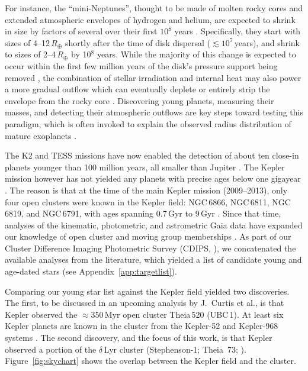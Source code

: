 \documentclass[12pt,modern,twocolumn,tighten]{aastex63}
\begin{document}
For instance, the ``mini-Neptunes'', thought to be made of molten
rocky cores \citep{kite_atmosphere_2020} and extended atmospheric
envelopes of hydrogen and helium, are expected to shrink in size by
factors of several over their first $10^8$ years
\citep{owen_atmospheres_2016,owen_constraining_2020}.  Specifically,
they start with sizes of 4--12\,$R_\oplus$ shortly after the time of disk
dispersal ($\lesssim$$10^7$\,years), and shrink to sizes of
2--4\,$R_\oplus$ by 10$^8$ years.  While the majority of this change
is expected to occur within the first few million years of the disk's pressure
support being removed \citep{owen_atmospheres_2016}, the combination of stellar
irradiation and internal heat may also power a more
gradual outflow which can eventually deplete or entirely strip the
envelope from the rocky core
\citep{Owen_Wu_2013,ginzburg_corepowered_2018}.  Discovering young
planets, measuring their masses, and detecting their atmospheric
outflows are key steps toward testing this paradigm, which is often
invoked to explain the observed radius distribution of mature
exoplanets \citep{Fulton_et_al_2017}.

The K2 and TESS missions have now enabled the detection of about ten
close-in planets younger than 100 million years, all smaller than
Jupiter
\citep{Mann_K2_33b_2016,David_et_al_2017,david_four_2019,newton_tess_2019,bouma_cluster_2020,plavchan_planet_2020,rizzuto_tess_2020}.
The Kepler mission however has not yielded any planets with precise
ages below one gigayear \citep{Meibom_et_al_2013}.  The reason is that
at the time of the main Kepler mission (2009--2013), only four open
clusters were known in the Kepler field: NGC\,6866, NGC\,6811,
NGC\,6819, and NGC\,6791, with ages spanning 0.7\,Gyr to 9\,Gyr
\citep{meibom_kepler_2011}.  Since that time, analyses of the
kinematic, photometric, and astrometric Gaia data have expanded our
knowledge of open cluster and moving group memberships \citep[{\it
e.g.},][]{cantatgaudin_gaia_2018,zari_3d_2018,kounkel_untangling_2019,Meingast2021,kerr_stars_2021}.
As part of our Cluster Difference Imaging Photometric Survey (CDIPS,
\citealt{bouma_cdipsI_2019}), we concatenated the available analyses
from the literature, which yielded a list of candidate young and
age-dated stars (see Appendix~\ref{app:targetlist}).

Comparing our young star list against the Kepler field yielded two
discoveries.  The first, to be discussed in an upcoming analysis by
J.~Curtis et al{.}, is that Kepler observed the $\approx$350\,Myr open
cluster Theia\,520 (UBC\,1).  At least six Kepler planets are known in
the cluster from the Kepler-52 and Kepler-968 systems
\citep{rowe_validation_2014,jontof-hutter_following_2021}.  The second
discovery, and the focus of this work, is that Kepler observed a
portion of the $\delta$\,Lyr cluster (Stephenson-1; Theia~73;
\citealt{stephenson_possible_1959}).  Figure~\ref{fig:skychart} shows
the overlap between the Kepler field and the cluster.
\end{document}
